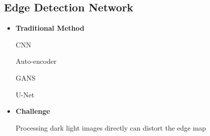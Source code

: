 \documentclass[CJK,aspectratio=169]{beamer}  %
\begin{document}
	\subsection{Edge Detection Network}
	
	\begin{frame}
		
		\begin{itemize} 
			\item \textbf{Traditional Method}
			
			CNN
			
			Auto-encoder
			
			GANS
			
			U-Net
		\end{itemize}
		\begin{itemize} 
			\item \textbf{Challenge}
			
			Processing dark light images directly can distort the edge map
			
		\end{itemize}
	\end{frame}
	
\end{document}
